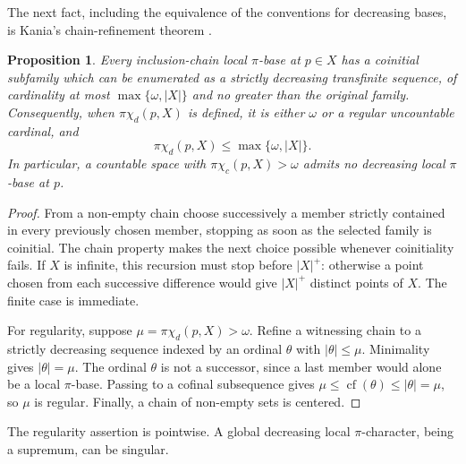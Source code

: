 \documentclass[11pt,a4paper]{amsart}
\newtheorem{proposition}[theorem]{Proposition}
\theoremstyle{definition}
\theoremstyle{remark}
\newcommand{\pcc}{\pi\chi_c}
\newcommand{\pcd}{\pi\chi_d}
\DeclareMathOperator{\cf}{cf}
\begin{document}
The next fact, including the equivalence of the conventions for decreasing bases, is Kania's chain-refinement theorem \cite[Theorem B and Corollary 2.2]{Kania}.

\begin{proposition}\label{prop:chains}
Every inclusion-chain local $\pi$-base at $p\in X$ has a coinitial subfamily which can be enumerated as a strictly decreasing transfinite sequence, of cardinality at most $\max\{\omega,|X|\}$ and no greater than the original family. Consequently, when $\pcd(p,X)$ is defined, it is either $\omega$ or a regular uncountable cardinal, and
\[
\pcd(p,X)\leqslant\max\{\omega,|X|\}.
\]
In particular, a countable space with $\pcc(p,X)>\omega$ admits no decreasing local $\pi$-base at $p$.
\end{proposition}
\begin{proof}
From a non-empty chain choose successively a member strictly contained in every previously chosen member, stopping as soon as the selected family is coinitial. The chain property makes the next choice possible whenever coinitiality fails. If $X$ is infinite, this recursion must stop before $|X|^+$: otherwise a point chosen from each successive difference would give $|X|^+$ distinct points of $X$. The finite case is immediate.

For regularity, suppose $\mu=\pcd(p,X)>\omega$. Refine a witnessing chain to a strictly decreasing sequence indexed by an ordinal $\theta$ with $|\theta|\leqslant\mu$. Minimality gives $|\theta|=\mu$. The ordinal $\theta$ is not a successor, since a last member would alone be a local $\pi$-base. Passing to a cofinal subsequence gives $\mu\leqslant\cf(\theta)\leqslant|\theta|=\mu$, so $\mu$ is regular. Finally, a chain of non-empty sets is centered.
\end{proof}

The regularity assertion is pointwise. A global decreasing local $\pi$-character, being a supremum, can be singular.
\end{document}
